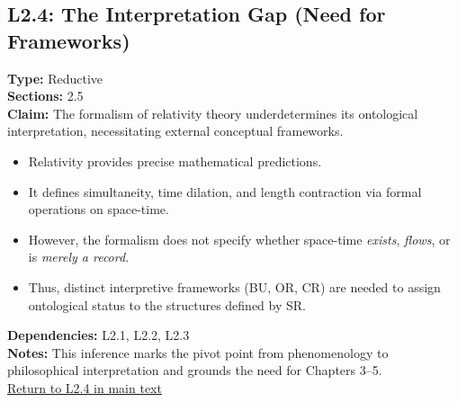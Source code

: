 \documentclass[12pt]{book}
\newcommand{\returnlink}[1]{\hyperref[logic:#1]{Return to #1 in main text}\xspace}
\begin{document}
\subsection*{L2.4: The Interpretation Gap (Need for Frameworks)}\label{appendix:L2.4}
\textbf{Type:} Reductive \\
\textbf{Sections:} 2.5 \\
\textbf{Claim:} The formalism of relativity theory underdetermines its ontological interpretation, necessitating external conceptual frameworks.
\begin{itemize}
  \item Relativity provides precise mathematical predictions.
  \item It defines simultaneity, time dilation, and length contraction via formal operations on space-time.
  \item However, the formalism does not specify whether space-time \textit{exists}, \textit{flows}, or is \textit{merely a record}.
  \item Thus, distinct interpretive frameworks (BU, OR, CR) are needed to assign ontological status to the structures defined by SR.
\end{itemize}
\textbf{Dependencies:} L2.1, L2.2, L2.3 \\
\textbf{Notes:} This inference marks the pivot point from phenomenology to philosophical interpretation and grounds the need for Chapters 3–5.\\
\returnlink{L2.4}
\end{document}
